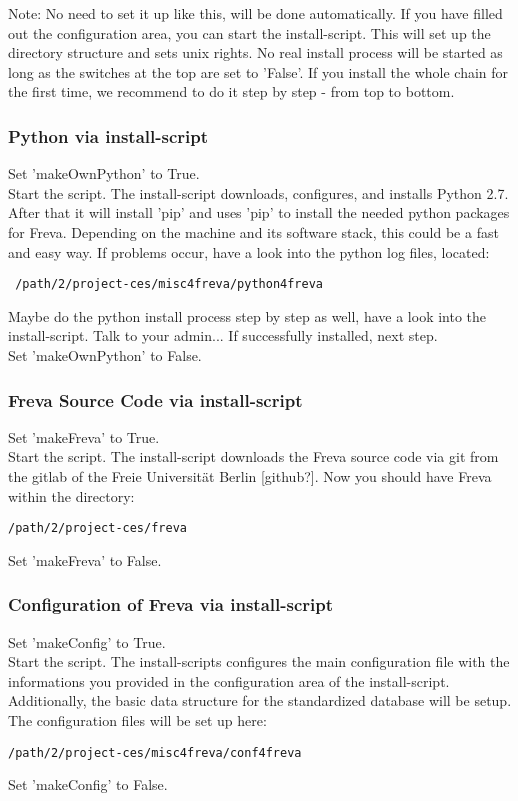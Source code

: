 \documentclass[a4paper,11pt]{ltxdoc}
\begin{document}
Note: No need to set it up like this, will be done automatically.
If you have filled out the configuration area, you can start the install-script. This will set up the directory structure and sets unix rights. No real install process will be started as long as the switches at the top are set to 'False'. If you install the whole chain for the first time, we recommend to do it step by step - from top to bottom. 
\subsubsection{Python via install-script}
Set 'makeOwnPython' to True. \\
Start the script. The install-script downloads, configures, and installs Python 2.7. After that it will install 'pip' and uses 'pip' to install the needed python packages for Freva. Depending on the machine and its software stack, this could be a fast and easy way. If problems occur, have a look into the python log files, located:
\begin{lstlisting}
 /path/2/project-ces/misc4freva/python4freva
\end{lstlisting}
Maybe do the python install process step by step as well, have a look into the install-script. Talk to your admin... If successfully installed, next step. \\
Set 'makeOwnPython' to False.
\subsubsection{Freva Source Code via install-script}
Set 'makeFreva' to True. \\
Start the script. The install-script downloads the Freva source code via git from the gitlab of the Freie Universität Berlin [github?]. Now you should have Freva within the directory:
\begin{lstlisting} 
/path/2/project-ces/freva
\end{lstlisting}
Set 'makeFreva' to False.
\subsubsection{Configuration of Freva via install-script}
Set 'makeConfig' to True. \\
Start the script. The install-scripts configures the main configuration file with the informations you provided in the configuration area of the install-script. Additionally, the basic data structure for the standardized database will be setup. The configuration files will be set up here:
\begin{lstlisting}
/path/2/project-ces/misc4freva/conf4freva \end{lstlisting}
Set 'makeConfig' to False.
\end{document}
